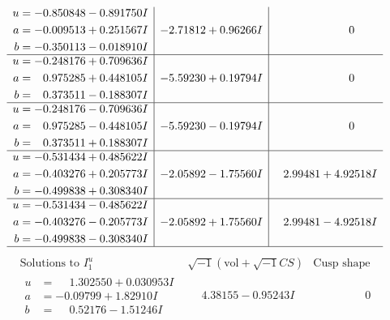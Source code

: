 \documentclass[1p]{elsarticle_modified}
\theoremstyle{definition}
\newcommand{\I}{\sqrt{-1}}
\begin{document}
$$\begin{array}{c|c|c}
\begin{aligned}
u &= -0.850848 - 0.891750 I \\
a &= -0.009513 + 0.251567 I \\
b &= -0.350113 - 0.018910 I\end{aligned}
 & -2.71812 + 0.96266 I & \phantom{-0.000000 } 0 \\ \hline\begin{aligned}
u &= -0.248176 + 0.709636 I \\
a &= \phantom{-}0.975285 + 0.448105 I \\
b &= \phantom{-}0.373511 - 0.188307 I\end{aligned}
 & -5.59230 + 0.19794 I & \phantom{-0.000000 } 0 \\ \hline\begin{aligned}
u &= -0.248176 - 0.709636 I \\
a &= \phantom{-}0.975285 - 0.448105 I \\
b &= \phantom{-}0.373511 + 0.188307 I\end{aligned}
 & -5.59230 - 0.19794 I & \phantom{-0.000000 } 0 \\ \hline\begin{aligned}
u &= -0.531434 + 0.485622 I \\
a &= -0.403276 + 0.205773 I \\
b &= -0.499838 + 0.308340 I\end{aligned}
 & -2.05892 - 1.75560 I & \phantom{-}2.99481 + 4.92518 I \\ \hline\begin{aligned}
u &= -0.531434 - 0.485622 I \\
a &= -0.403276 - 0.205773 I \\
b &= -0.499838 - 0.308340 I\end{aligned}
 & -2.05892 + 1.75560 I & \phantom{-}2.99481 - 4.92518 I\\
 \hline 
 \end{array}$$\newpage$$\begin{array}{c|c|c}  
\text{Solutions to }I^u_{1}& \I (\text{vol} + \sqrt{-1}CS) & \text{Cusp shape}\\
 \hline 
\begin{aligned}
u &= \phantom{-}1.302550 + 0.030953 I \\
a &= -0.09799 + 1.82910 I \\
b &= \phantom{-}0.52176 - 1.51246 I\end{aligned}
 & \phantom{-}4.38155 - 0.95243 I & \phantom{-0.000000 } 0 \\ \hline\begin{aligned}

\end{aligned}
\end{array}$$
\end{document}
